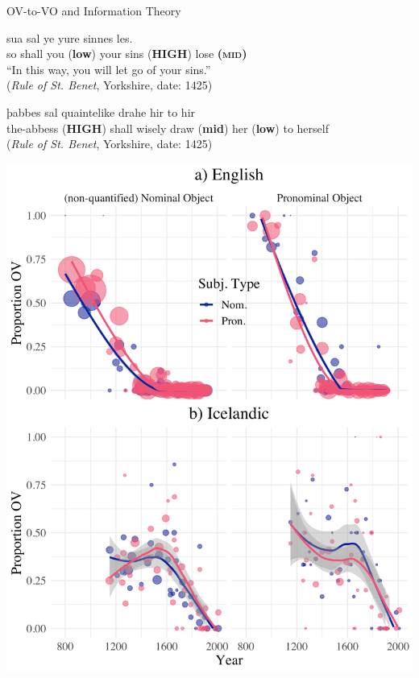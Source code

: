 \documentclass[hyperref={pdfpagelabels=false}]{beamer}
\begin{document}
\begin{frame}{OV-to-VO and Information Theory} 


\begin{exe}	
	\ex \gll sua sal ye yure sinnes les.\\
so shall {you (\textbf{\small{low}})} your {sins (\textbf{HIGH})} {lose \textbf{(\textsc{mid})}}\\
\quad ``In this way, you will let go of your sins.''\\
(\textsl{Rule of St. Benet}, Yorkshire, date: 1425)\\\vspace{5mm}


\ex \gll þabbes sal quaintelike drahe hir to hir\\
{the-abbess (\textbf{HIGH})} shall wisely {draw (\textbf{mid})} {her (\textbf{\small{low}})} to herself\\
(\textsl{Rule of St. Benet}, Yorkshire, date: 1425)

	
\end{exe}
\end{frame}


\begin{frame}
	
	\begin{center}
	\includegraphics[scale = 0.5]{Fig3-4.png}
	\end{center}
\end{frame}
\end{document}

